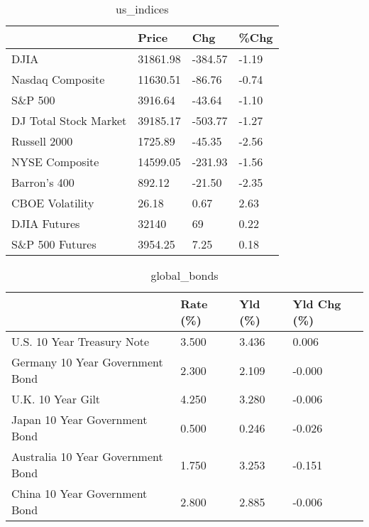 \documentclass{article}%
\begin{document}
%


\begin{table}[htbp]%
\caption{us\_indices}%
\centering%
\begin{adjustbox}{width=1\textwidth}%
\begin{tabular}{llll}
\toprule
                      &    Price &     Chg &  \%Chg \\
\midrule
                 DJIA & 31861.98 & -384.57 & -1.19 \\
     Nasdaq Composite & 11630.51 &  -86.76 & -0.74 \\
              S\&P 500 &  3916.64 &  -43.64 & -1.10 \\
DJ Total Stock Market & 39185.17 & -503.77 & -1.27 \\
         Russell 2000 &  1725.89 &  -45.35 & -2.56 \\
       NYSE Composite & 14599.05 & -231.93 & -1.56 \\
         Barron's 400 &   892.12 &  -21.50 & -2.35 \\
      CBOE Volatility &    26.18 &    0.67 &  2.63 \\
         DJIA Futures &    32140 &      69 &  0.22 \\
      S\&P 500 Futures &  3954.25 &    7.25 &  0.18 \\
\bottomrule
\end{tabular}
%
\end{adjustbox}%
\end{table}

%


\begin{table}[htbp]%
\caption{global\_bonds}%
\centering%
\begin{adjustbox}{width=1\textwidth}%
\begin{tabular}{llll}
\toprule
                                  & Rate (\%) & Yld (\%) & Yld Chg (\%) \\
\midrule
       U.S. 10 Year Treasury Note &    3.500 &   3.436 &       0.006 \\
  Germany 10 Year Government Bond &    2.300 &   2.109 &      -0.000 \\
                U.K. 10 Year Gilt &    4.250 &   3.280 &      -0.006 \\
    Japan 10 Year Government Bond &    0.500 &   0.246 &      -0.026 \\
Australia 10 Year Government Bond &    1.750 &   3.253 &      -0.151 \\
    China 10 Year Government Bond &    2.800 &   2.885 &      -0.006 \\
\bottomrule
\end{tabular}
%
\end{adjustbox}%
\end{table}
\end{document}

